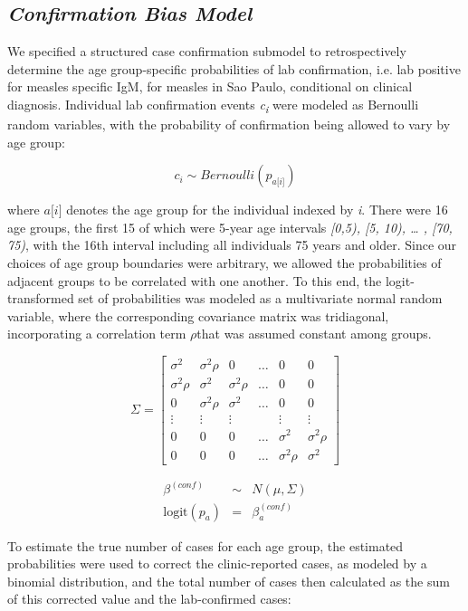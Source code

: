 \subsection{\texorpdfstring{\emph{Confirmation Bias
Model}}{Confirmation Bias Model}}\label{confirmation-bias-model}

We specified a structured case confirmation submodel to retrospectively
determine the age group-specific probabilities of lab confirmation, i.e.
lab positive for measles specific IgM, for measles in Sao Paulo,
conditional on clinical diagnosis. Individual lab confirmation events
\emph{c\textsubscript{i}} were modeled as Bernoulli random variables,
with the probability of confirmation being allowed to vary by age group:

\[c_{i} \sim Bernoulli(p_{a\lbrack i\rbrack})\]

where \(a\lbrack i\rbrack\) denotes the age group for the individual
indexed by \emph{i}. There were 16 age groups, the first 15 of which
were 5-year age intervals \emph{{[}0,5), {[}5, 10), \ldots{} , {[}70,
75)}, with the 16th interval including all individuals 75 years and
older. Since our choices of age group boundaries were arbitrary, we
allowed the probabilities of adjacent groups to be correlated with one
another. To this end, the logit-transformed set of probabilities was
modeled as a multivariate normal random variable, where the
corresponding covariance matrix was tridiagonal, incorporating a
correlation term \(\rho\)that was assumed constant among groups.

\[
\Sigma = \left[{
\begin{array}{c}
  {\sigma^2} & {\sigma^2 \rho} & 0& \ldots & {0} & {0}  \\
  {\sigma^2 \rho} & {\sigma^2} &  \sigma^2 \rho & \ldots & {0}  & {0} \\
  {0} & \sigma^2 \rho & {\sigma^2} & \ldots & {0} & {0} \\
  \vdots & \vdots & \vdots &  & \vdots & \vdots\\
  {0} & {0} & 0 & \ldots &  {\sigma^2} & \sigma^2 \rho  \\
{0} & {0} & 0 & \ldots & \sigma^2 \rho &  {\sigma^2} 
\end{array}
}\right]\]

\begin{eqnarray}
\beta^{(conf)} &\sim& N(\mu, \Sigma) \\
\text{logit}(p_a) &=& \beta_a^{(conf)}
\end{eqnarray}

To estimate the true number of cases for each age group, the estimated probabilities were used to correct the clinic-reported cases, as modeled by a binomial distribution, and the total number of cases then calculated as the sum of this corrected value and the lab-confirmed cases:

